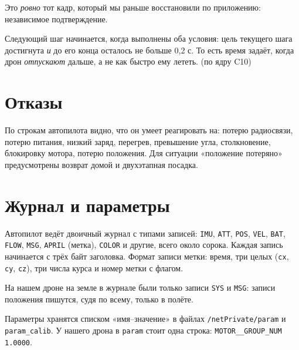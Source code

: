 \vspace{4pt}
\pr{} Это \emph{ровно} тот кадр, который мы раньше восстановили по приложению: независимое подтверждение.

\begin{zametka}
Следующий шаг начинается, когда выполнены оба условия: цель текущего шага достигнута \emph{и} до его конца осталось не больше 0,2 с. То есть время задаёт, когда дрон \emph{отпускают} дальше, а не как быстро ему лететь. \pr{} (по ядру C10)
\end{zametka}

\section{Отказы}

По строкам автопилота видно, что он умеет реагировать на: потерю радиосвязи, потерю питания, низкий заряд, перегрев, превышение угла, столкновение, блокировку мотора, потерю положения. Для ситуации «положение потеряно» предусмотрены возврат домой и двухэтапная посадка. \pr{}

\section{Журнал и параметры}

Автопилот ведёт двоичный журнал с типами записей: \texttt{IMU}, \texttt{ATT}, \texttt{POS}, \texttt{VEL}, \texttt{BAT}, \texttt{FLOW}, \texttt{MSG}, \texttt{APRIL} (метка), \texttt{COLOR} и другие, всего около сорока. Каждая запись начинается с трёх байт заголовка. Формат записи метки: время, три целых (\texttt{cx}, \texttt{cy}, \texttt{cz}), три числа курса и номер метки с флагом. \pr{}

На нашем дроне на земле в журнале были только записи \texttt{SYS} и \texttt{MSG}: записи положения пишутся, судя по всему, только в полёте. \vyv{}

Параметры хранятся списком «имя--значение» в файлах \texttt{/netPrivate/param} и \texttt{param\_calib}. У нашего дрона в \texttt{param} стоит одна строка: \texttt{MOTOR\_\_GROUP\_NUM 1.0000}. \pr{}

